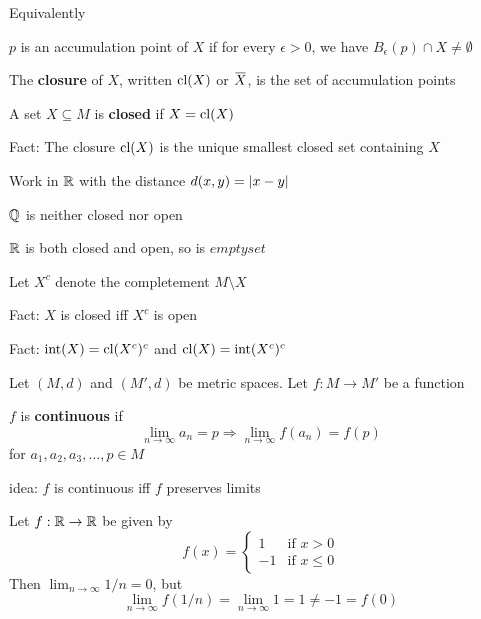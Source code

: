 \documentclass[11pt]{article}
\def \tint {\text{int}}
\begin{document}
Equivalently
\begin{definition}[]
\(p\) is an accumulation point of \(X\) if for every \(\epsilon>0\), we have \(B_\epsilon(p)\cap X\neq\emptyset\)
\end{definition}

\begin{definition}[]
The \textbf{closure} of \(X\), written \(\operatorname{\text{cl}}(X)\) or \(\barX\), is the set of accumulation points
\end{definition}

\begin{definition}[]
A set \(X\subseteq M\) is \textbf{closed} if \(X=\operatorname{\text{cl}}(X)\)
\end{definition}


Fact: The closure \(\operatorname{\text{cl}}(X)\) is the unique smallest closed set containing \(X\)

\begin{examplle}[]
Work in \(\mathbb{R}\) with the distance \(d(x,y)=\abs{x-y}\)

\(\mathbb{Q}\) is neither closed nor open

\(\mathbb{R}\) is both closed and open, so is \(emptyset\)
\end{examplle}

Let \(X^c\) denote the completement \(M\setminus X\)

Fact: \(X\) is closed iff \(X^c\) is open

Fact: \(\tint(X)=\cl(X^c)^c\) and \(\cl(X)=\tint(X^c)^c\)

Let \((M,d)\) and \((M',d)\) be metric spaces. Let \(f:M\to M'\) be a function
\begin{definition}[]
\(f\) is \textbf{continuous} if
\begin{equation*}
\lim_{n\to\infty}a_n=p\Rightarrow\lim_{n\to\infty}f(a_n)=f(p)
\end{equation*}
for \(a_1,a_2,a_3,\dots,p\in M\)
\end{definition}

idea: \(f\) is continuous iff \(f\) preserves limits

\begin{examplle}[]
Let \(f:\mathbb{R}\to\mathbb{R}\) be given by
\begin{equation*}
f(x)=
\begin{cases}
1&\text{if }x>0\\
-1&\text{if }x\le 0
\end{cases}
\end{equation*}
Then \(\lim_{n\to\infty}1/n=0\), but
\begin{equation*}
\lim_{n\to\infty}f(1/n)=\lim_{n\to\infty}1=1\neq-1=f(0)
\end{equation*}
\end{examplle}
\end{document}
